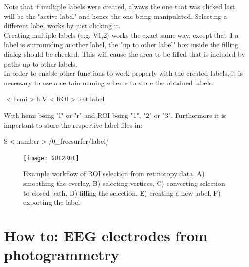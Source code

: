 \documentclass[12pt,a4paper]{scrartcl}
\begin{document}
\noindent Note that if multiple labels were created, always the one that was clicked last, will be the "active label" and hence the one being manipulated. Selecting a different label works by just clicking it.\\

\noindent Creating multiple labels (e.g. V1,2) works the exact same way, except that if a label is surrounding another label, the "up to other label" box inside the filling dialog should be checked. This will cause the area to be filled that is included by paths up to other labels.\\

\noindent In order to enable other functions to work properly with the created labels, it is necessary to use a certain naming scheme to store the obtained labels:\\
\begin{center}
  $<$hemi$>$h.V$<$ROI$>$.ret.label
\end{center}
\noindent With hemi being "l" or "r" and ROI being "1", "2" or "3". Furthermore it is important to store the respective label files in:\\
\begin{center}
  S$<$number$>$/0\_freesurfer/label/
\end{center}
\begin{figure}[!h]
  \texttt{[image: GUI2ROI]}

  \caption{Example workflow of ROI selection from retinotopy data. A) smoothing the overlay, B) selecting vertices, C) converting selection to closed path, D) filling the selection, E) creating a new label, F) exporting the label}

  \label{fig:GUI2ROI}
\end{figure}

\section{How to: EEG electrodes from photogrammetry}
\label{sec:HTphotogr}
\end{document}
